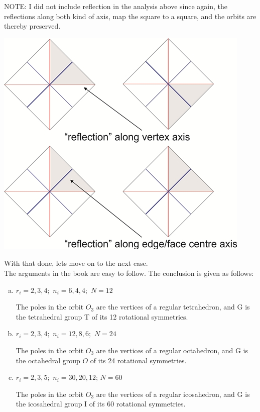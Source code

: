 \documentclass[12pt]{article}
\begin{document}
\par
NOTE: I did not include reflection in the analysis above since again, the reflections along both kind of axis, map the square to a square, and the orbits are thereby preserved.\\
\begin{center}
\includegraphics[width=0.4\linewidth]{square_reflections.jpg}
\end{center}
\vspace{40pt}
With that done, lets move on to the next case.\\
The arguments in the book are easy to follow. The conclusion is given as follows:
\begin{enumerate}[(a)]
\item $r_{i}=2,3,4;\,\,n_{i}=6,4,4;\,\,N=12$
\par
The poles in the orbit $O_{3}$ are the vertices of a regular tetrahedron, and G is the tetrahedral group T of its 12 rotational symmetries.
\item $r_{i}=2,3,4;\,\,n_{i}=12,8,6;\,\,N=24$
\par
The poles in the orbit $O_{3}$ are the vertices of a regular octahedron, and G is the octahedral group $O$ of its 24 rotational symmetries.
\item $r_{i}=2,3,5;\,\,n_{i}=30,20,12;\,N=60$
\par
The poles in the orbit $O_{3}$ are the vertices of a regular icosahedron, and G is the icosahedral group I of its 60 rotational symmetries.\\
\end{enumerate}
\par
\end{document}
